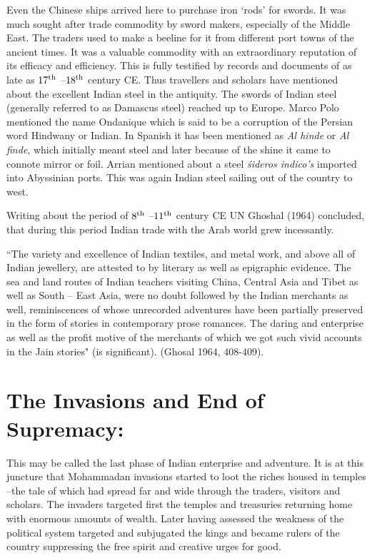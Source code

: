 Even the Chinese ships arrived here to purchase iron `rods' for swords. It was much sought after trade commodity by sword makers, especially of the Middle East. The traders used to make a beeline for it from different port towns of the ancient times. It was a valuable commodity with an extraordinary reputation of its efficacy and efficiency. This is fully testified by records and documents of as late as $17^{\rm th}$ –$18^{\rm th}$ century CE. Thus travellers and scholars have mentioned about the excellent Indian steel in the antiquity. The swords of Indian steel (generally referred to as Damascus steel) reached up to Europe. Marco Polo mentioned the name Ondanique which is said to be a corruption of the Persian word Hindwany or Indian. In Spanish it has been mentioned as {\it Al hinde} or {\it Al finde}, which initially meant steel and later because of the shine it came to connote mirror or foil. Arrian mentioned about a steel {\it śideros indico's} imported into Abyssinian ports. This was again Indian steel sailing out of the country to west. 

Writing about the period of $8^{\rm th}$ –$11^{\rm th}$ century CE UN Ghoshal (1964) concluded, that during this period Indian trade with the Arab world grew incessantly.

{\footnotesize{``The variety and excellence of Indian textiles, and metal work, and above all of Indian jewellery, are attested to by literary as well as epigraphic evidence. The sea and land routes of Indian teachers visiting China, Central Asia and Tibet as well as South – East Asia, were no doubt followed by the Indian merchants as well, reminiscences of whose unrecorded adventures have been partially preserved in the form of stories in contemporary prose romances. The daring and enterprise as well as the profit motive of the merchants of which we got such vivid accounts in the Jain stories"}} (is significant). (Ghosal 1964, 408-409).

\vspace{-.3cm}

\section*{The Invasions and End of Supremacy:}

\vspace{-.2cm}

This may be called the last phase of Indian enterprise and adventure. It is at this juncture that Mohammadan invasions started to loot the riches housed in temples –the tale of which had spread far and wide through the traders, visitors and scholars. The invaders targeted first the temples and treasuries returning home with enormous amounts of wealth. Later having assessed the weakness of the political system targeted and subjugated the kings and became rulers of the country suppressing the free spirit and creative urges for good.

